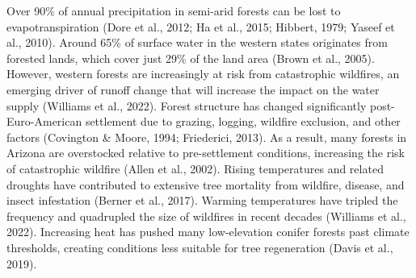 \documentclass[
]{agujournal2019}
\begin{document}
Over 90\% of annual precipitation in semi-arid forests can be lost to
evapotranspiration (Dore et al., 2012; Ha et al., 2015; Hibbert, 1979;
Yaseef et al., 2010). Around 65\% of surface water in the western states
originates from forested lands, which cover just 29\% of the land area
(Brown et al., 2005). However, western forests are increasingly at risk
from catastrophic wildfires, an emerging driver of runoff change that
will increase the impact on the water supply (Williams et al., 2022).
Forest structure has changed significantly post-Euro-American settlement
due to grazing, logging, wildfire exclusion, and other factors
(Covington \& Moore, 1994; Friederici, 2013). As a result, many forests
in Arizona are overstocked relative to pre-settlement conditions,
increasing the risk of catastrophic wildfire (Allen et al., 2002).
Rising temperatures and related droughts have contributed to extensive
tree mortality from wildfire, disease, and insect infestation (Berner et
al., 2017). Warming temperatures have tripled the frequency and
quadrupled the size of wildfires in recent decades (Williams et al.,
2022). Increasing heat has pushed many low-elevation conifer forests
past climate thresholds, creating conditions less suitable for tree
regeneration (Davis et al., 2019).
\end{document}
